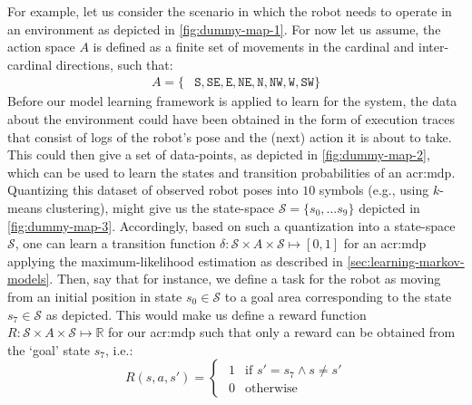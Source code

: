 For example, let us consider the scenario in which the robot needs to operate in an environment as depicted in \autoref{fig:dummy-map-1}.
For now let us assume, the action space $A$ is defined as a finite set of movements in the cardinal and inter-cardinal directions, such that: 
\begin{align*}
	A = \{&\texttt{S}, \texttt{SE}, \texttt{E}, \texttt{NE},
		  \texttt{N}, \texttt{NW}, \texttt{W}, \texttt{SW}  \}
\end{align*}\newpage
Before our model learning framework is applied to learn  for the system, the data about the environment could have been obtained in the form of execution traces that consist of logs of the robot's pose and the (next) action it is about to take.
This could then give a set of data-points, as depicted in \autoref{fig:dummy-map-2}, which can be used to learn the states and transition probabilities of an \acrshort{acr:mdp}.
Quantizing this dataset of observed robot poses into $10$ symbols (e.g., using $k$-means clustering), might give us the state-space $\mathcal{S} = \{s_0, \ldots s_9\}$ depicted in \autoref{fig:dummy-map-3}.
Accordingly, based on such a quantization into a state-space $\mathcal{S}$, one can learn a transition function $\delta: \mathcal{S} \times A \times \mathcal{S} \mapsto [0, 1]$ for an \acrshort{acr:mdp} applying the maximum-likelihood estimation as described in \autoref{sec:learning-markov-models}.
Then, say that for instance, we define a task for the robot as moving from an initial position in state $s_0 \in \mathcal{S}$ to a goal area corresponding to the state $s_7 \in \mathcal{S}$ as depicted.
This would make us define a reward function $R: \mathcal{S} \times A \times \mathcal{S} \mapsto \mathbb{R}$ for our \acrshort{acr:mdp} such that only a reward can be obtained from the `goal' state $s_7$, i.e.:
\[
R(s, a, s') = 
\begin{cases}
\hspace{4pt} 	1 & \text{if } s' = s_7 \land s \neq s'\\
\hspace{4pt} 	0 & \text{otherwise}
\end{cases}
\]

